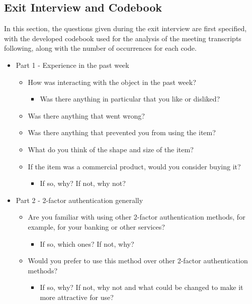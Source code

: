 \documentclass{l4proj}
\begin{document}
\begin{appendices}
\chapter{Exit Interview and Codebook}

In this section, the questions given during the exit interview are first specified, with the developed codebook used for the analysis of the meeting transcripts following, along with the number of occurrences for each code.

\begin{itemize}
    \item Part 1 - Experience in the past week
    \begin{itemize}
        \item How was interacting with the object in the past week?
        \begin{itemize}
            \item Was there anything in particular that you like or disliked?
        \end{itemize}
        \item Was there anything that went wrong?
        \item Was there anything that prevented you from using the item?
        \item What do you think of the shape and size of the item?
        \item If the item was a commercial product, would you consider buying it?
        \begin{itemize}
            \item If so, why? If not, why not?
        \end{itemize}
    \end{itemize}
    \item Part 2 - 2-factor authentication generally
    \begin{itemize}
        \item Are you familiar with using other 2-factor authentication methods, for example, for your banking or other services?
        \begin{itemize}
            \item If so, which ones? If not, why?
        \end{itemize}
        \item Would you prefer to use this method over other 2-factor authentication methods?
        \begin{itemize}
            \item If so, why? If not, why not and what could be changed to make it more attractive for use?

\end{itemize}
\end{itemize}
\end{itemize}
\end{appendices}
\end{document}
